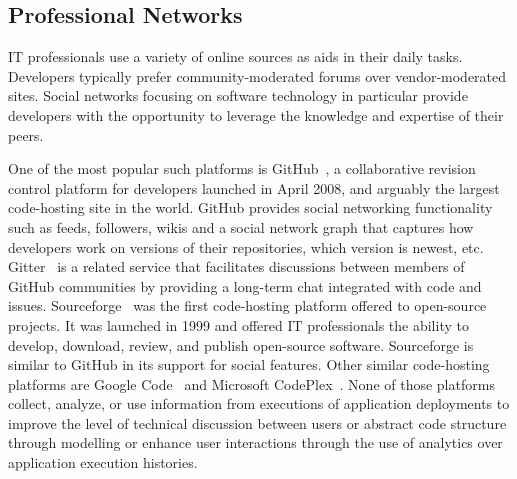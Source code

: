 \subsection{Professional Networks}

 
IT professionals use a variety of online sources as aids in their daily tasks. Developers typically prefer community-moderated forums over vendor-moderated sites. Social networks focusing on software technology in particular provide developers with the opportunity to leverage the knowledge and expertise of their peers.
 
One of the most popular such platforms is GitHub~\cite{github_url}, a collaborative revision control platform for developers launched in April 2008, and arguably the largest code-hosting site in the world. 
GitHub provides social networking functionality such as feeds, followers, wikis and a social network graph that captures how developers work on versions of their repositories, which version is newest, etc.
Gitter~\cite{gitter} is a related service that facilitates discussions between members of GitHub communities by providing a long-term chat integrated with code and issues.
Sourceforge~\cite{sourceforge} was the first code-hosting platform offered to open-source projects. It was launched in 1999 and offered IT professionals the ability to develop, download, review, and publish open-source software. Sourceforge is similar to GitHub in its support for social features.
Other similar code-hosting platforms are Google Code~\cite{googlecode} and Microsoft CodePlex~\cite{codeplex}.
None of those platforms collect, analyze, or use information from executions of application deployments to improve the level of technical discussion between users or abstract code structure through modelling or enhance user interactions through the use of analytics over application execution histories.

